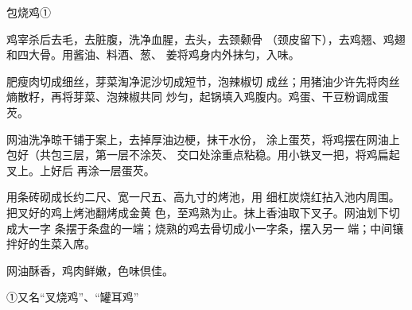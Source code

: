 \begin{recipe}{包烧鸡①}

\ingredients



\cooking

\step 鸡宰杀后去毛，去脏腹，洗净血腥，去头，去颈颡骨 （颈皮留下），去鸡翘、鸡翅和四大骨。用酱油、料酒、葱、 姜将鸡身内外抹匀，入味。

\step 肥瘦肉切成细丝，芽菜淘净泥沙切成短节，泡辣椒切 成丝；用猪油少许先将肉丝熵散籽，再将芽菜、泡辣椒共同 炒匀，起锅填入鸡腹内。鸡蛋、干豆粉调成蛋芡。

\step 网油洗净晾干铺于案上，去掉厚油边梗，抹干水份， 涂上蛋芡，将鸡摆在网油上包好（共包三层，第一层不涂芡、 交口处涂重点粘稳。用小铁叉一把，将鸡扁起叉上。上好后 再涂一层蛋芡。

\step 用条砖砌成长约二尺、宽一尺五、高九寸的烤池，用 细杠炭烧红拈入池内周围。把叉好的鸡上烤池翻烤成金黄 色，至鸡熟为止。抹上香油取下叉子。网油划下切成大一字 条摆于条盘的一端；烧熟的鸡去骨切成小一字条，摆入另一 端；中间镶拌好的生菜入席。

\notes

网油酥香，鸡肉鲜嫩，色味倶佳。

①又名“叉烧鸡”、“罐耳鸡”

\end{recipe}

